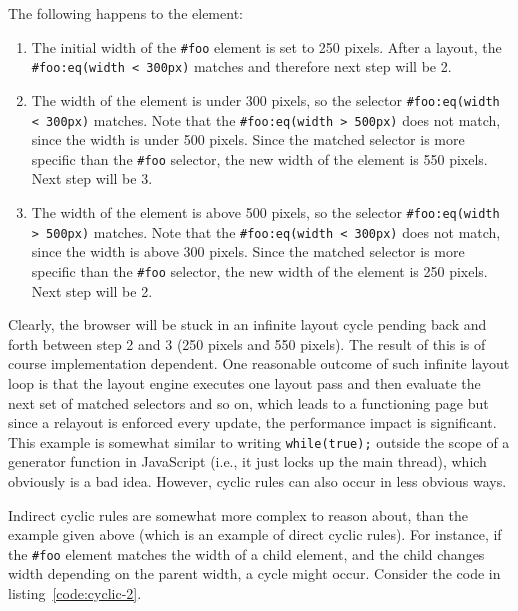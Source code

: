 \documentclass[a4paper,11pt]{kth-mag}
\newcommand{\code}[1]{\texttt{#1}}
\begin{document}
        The following happens to the \gls{element}:
        \begin{enumerate}
        \item The initial width of the \code{\#foo} \gls{element} is set to 250 pixels.
        After a layout, the \code{\#foo:eq(width < 300px)} matches and therefore next step will be 2.
        \item The width of the \gls{element} is under 300 pixels, so the selector \code{\#foo:eq(width < 300px)} matches.
        Note that the \code{\#foo:eq(width > 500px)} does not match, since the width is under 500 pixels.
        Since the matched selector is more specific than the \code{\#foo} selector, the new width of the \gls{element} is 550 pixels.
        Next step will be 3.
        \item The width of the \gls{element} is above 500 pixels, so the selector \code{\#foo:eq(width > 500px)} matches.
        Note that the \code{\#foo:eq(width < 300px)} does not match, since the width is above 300 pixels.
        Since the matched selector is more specific than the \code{\#foo} selector, the new width of the \gls{element} is 250 pixels.
        Next step will be 2.
        \end{enumerate}
        Clearly, the \gls{browser} will be stuck in an infinite layout cycle pending back and forth between step 2 and 3 (250 pixels and 550 pixels).
        The result of this is of course implementation dependent.
        One reasonable outcome of such infinite layout loop is that the \gls{layout engine} executes one layout pass and then evaluate the next set of matched selectors and so on, which leads to a functioning page but since a relayout is enforced every update, the performance impact is significant.
        This example is somewhat similar to writing \code{while(true);} outside the scope of a generator function in JavaScript (i.e., it just locks up the main thread), which obviously is a bad idea.
        However, cyclic rules can also occur in less obvious ways. 

        Indirect cyclic rules are somewhat more complex to reason about, than the example given above (which is an example of direct cyclic rules).
        For instance, if the \code{\#foo} \gls{element} matches the width of a child \gls{element}, and the child changes width depending on the parent width, a cycle might occur.
        Consider the code in listing~\ref{code:cyclic-2}.
        
\end{document}
